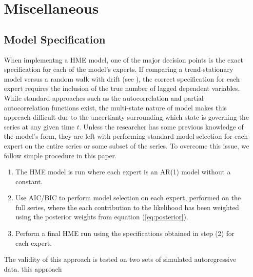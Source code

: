 \documentclass[12pt]{article}
\begin{document}
\section{Miscellaneous}
\subsection{Model Specification}
When implementng a HME model, one of the major decision points is the exact specification for each of the model's experts. If comparing a trend-stationary model versus a random walk with drift (see \cite{HertaJiangTanner}), the correct specification for each expert requires the inclusion of the true number of lagged dependent variables. While standard approaches such as the autocorrelation and partial autocorrelation functions exist, the multi-state nature of model makes this appreach difficult due to the uncertianty surrounding which state is governing the series at any given time $t$. Unless the researcher has some previous knowledge of the model's form, they are left with performing standard model selection for each expert on the entire series or some subset of the series. To overcome this issue, we follow simple procedure in this paper.

\begin{enumerate}
\item The HME model is run where each expert is an AR(1) model without a constant.
\item Use AIC/BIC to perform model selection on each expert, performed on the full series, where the each contribution to the likelihood has been weighted using the posterior weights from equation (\ref{eq:posterior}).
\item Perform a final HME run using the specifications obtained in step (2) for each expert.
\end{enumerate}

The validity of this approach is tested on two sets of simulated autoregressive data. this approach
\end{document}
